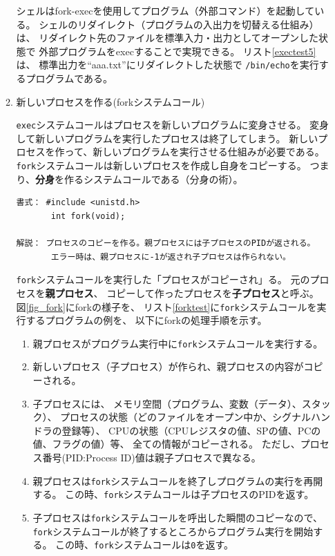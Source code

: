 \documentclass[a4j,dvipdfmx]{jarticle}
\begin{document}
\begin{enumerate}
\begin{enumerate}
シェルはfork-execを使用してプログラム（外部コマンド）を起動している。
シェルのリダイレクト（プログラムの入出力を切替える仕組み）は、
リダイレクト先のファイルを標準入力・出力としてオープンした状態で
外部プログラムをexecすることで実現できる。
リスト\ref{exectest5}は、
標準出力を``aaa.txt''にリダイレクトした状態で
\verb;/bin/echo;を実行するプログラムである。



\item 新しいプロセスを作る(forkシステムコール)

\verb/exec/システムコールはプロセスを新しいプログラムに変身させる。
変身して新しいプログラムを実行したプロセスは終了してしまう。
新しいプロセスを作って、新しいプログラムを実行させる仕組みが必要である。
\verb/fork/システムコールは新しいプロセスを作成し自身をコピーする。
つまり、{\bf 分身}を作るシステムコールである（分身の術）。

\begin{lstlisting}[numbers=none]
書式： #include <unistd.h>
       int fork(void);

解説： プロセスのコピーを作る。親プロセスには子プロセスのPIDが返される。
       エラー時は、親プロセスに-1が返され子プロセスは作られない。
\end{lstlisting}

\verb/fork/システムコールを実行した「プロセスがコピーされ」る。
元のプロセスを{\bf 親プロセス}、
コピーして作ったプロセスを{\bf 子プロセス}と呼ぶ。
図\ref{fig_fork}にforkの様子を、
リスト\ref{forktest}に\verb/fork/システムコールを実行するプログラムの例を、
以下にforkの処理手順を示す。

\begin{enumerate}
\item 親プロセスがプログラム実行中に\verb/fork/システムコールを実行する。
\item 新しいプロセス（子プロセス）が作られ、親プロセスの内容がコピーされる。
\item 子プロセスには、
メモリ空間（プログラム、変数（データ）、スタック）、
プロセスの状態（どのファイルをオープン中か、シグナルハンドラの登録等）、
CPUの状態（CPUレジスタの値、SPの値、PCの値、フラグの値）等、
全ての情報がコピーされる。
ただし、プロセス番号(PID:Process ID)値は親子プロセスで異なる。
\item 親プロセスは\verb/fork/システムコールを終了しプログラムの実行を再開する。
この時、\verb/fork/システムコールは子プロセスのPIDを返す。
\item 子プロセスは\verb/fork/システムコールを呼出した瞬間のコピーなので、
\verb/fork/システムコールが終了するところからプログラム実行を開始する。
この時、\verb/fork/システムコールは\verb/0/を返す。
\end{enumerate}


\end{enumerate}
\end{enumerate}
\end{document}

